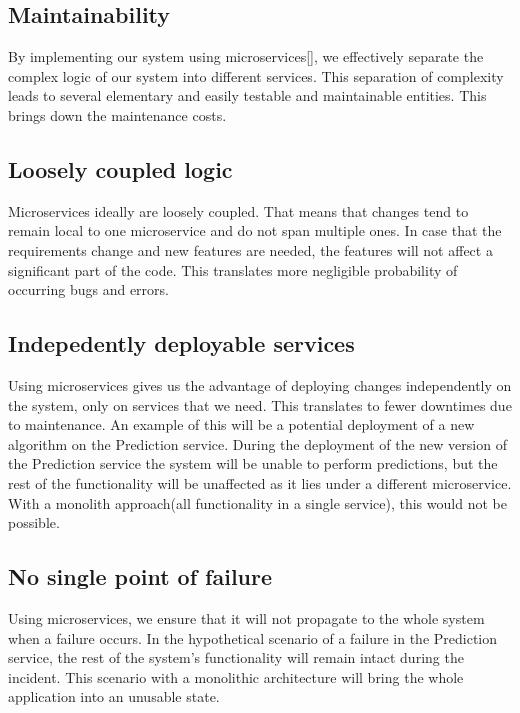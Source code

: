 		\subsection{Maintainability}
			By implementing our system using microservices[\cite{newman_2020}], we effectively separate the complex 
			logic of our system into different services. This separation of complexity leads to several elementary and 
			easily testable and maintainable entities. This brings down the maintenance costs.
		\subsection{Loosely coupled logic}
			Microservices ideally are loosely coupled. That means that changes tend to remain local to one microservice and do 
			not span multiple ones. In case that the requirements change and new features are needed, the features will not affect 
			a significant part of the code. This translates more negligible probability of occurring bugs and errors.
		\subsection{Indepedently deployable services}
			Using microservices gives us the advantage of deploying changes independently on the system, only on services that we need.
			This translates to fewer downtimes due to maintenance. An example of this will be a potential deployment of a new
			algorithm on the Prediction service. During the deployment of the new version of the Prediction service the system 
			will be unable to perform predictions, but the rest of the functionality will be unaffected as it lies under a different 
			microservice. With a monolith approach(all functionality in a single service), this would not be possible.
		\subsection{No single point of failure}
			Using microservices, we ensure that it will not propagate to the whole system when a failure occurs. In the hypothetical 
			scenario of a failure in the Prediction service, the rest of the system's functionality will remain intact during the 
			incident. This scenario with a monolithic architecture will bring the whole application into an unusable state.
